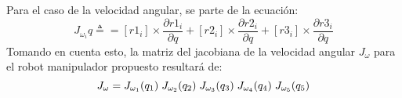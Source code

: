     Para el caso de la velocidad angular, se parte de la ecuación:
    \begin{equation*}
        J_{\omega _i}q \triangleq = [r1_i] \times\frac{\partial r1_i}{\partial q} + [r2_i] \times\frac{\partial r2_i}{\partial q}
                                    + [r3_i] \times\frac{\partial r3_i}{\partial q}
    \end{equation*}
    Tomando en cuenta esto, la matriz del jacobiana de la velocidad angular $J_{\omega}$ para el robot manipulador propuesto
    resultará de:
    \begin{equation*}
        J_\omega = J_{\omega_1}(q_1) \hspace{1mm} J_{\omega_2}(q_2) \hspace{1mm} J_{\omega_3}(q_3) \hspace{1mm} J_{\omega_4}(q_4) \hspace{1mm} J_{\omega_5}(q_5)
    \end{equation*}
